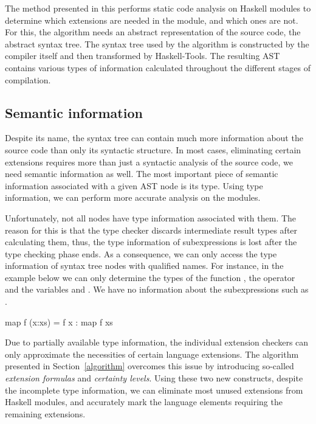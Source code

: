 \documentclass[main.tex]{subfiles}
\begin{document}
	
	The method presented in this \paper{} performs static code analysis on Haskell modules to determine which extensions are needed in the module, and which ones are not. For this, the algorithm needs an abstract representation of the source code, the abstract syntax tree. The syntax tree used by the algorithm is constructed by the compiler itself and then transformed by Haskell-Tools. The resulting AST contains various types of information calculated throughout the different stages of compilation. 
	
	\subsection{Semantic information}
	
	
	Despite its name, the syntax tree can contain much more information about the source code than only its syntactic structure. In most cases, eliminating certain extensions requires more than just a syntactic analysis of the source code, we need semantic information as well. The most important piece of semantic information associated with a given AST node is its type. Using type information, we can perform more accurate analysis on the modules.
	
	Unfortunately, not all nodes have type information associated with them. The reason for this is that the type checker discards intermediate result types after calculating them, thus, the type information of subexpressions is lost after the type checking phase ends. As a consequence, we can only access the type information of syntax tree nodes with qualified names. For instance, in the example below we can only determine the types of the function , the operator \ilcode{(:)} and the variables  and . We have no information about the subexpressions such as .
	
	\begin{oneLineHaskell}
		map f (x:xs) = f x : map f xs
	\end{oneLineHaskell}
	
	Due to partially available type information, the individual extension checkers can only approximate the necessities of certain language extensions. The algorithm presented in Section~\ref{algorithm} overcomes this issue by introducing so-called \emph{extension formulas} and \emph{certainty levels}. Using these two new constructs, despite the incomplete type information, we can eliminate most unused extensions from Haskell modules, and accurately mark the language elements requiring the remaining extensions.
	
\end{document}
